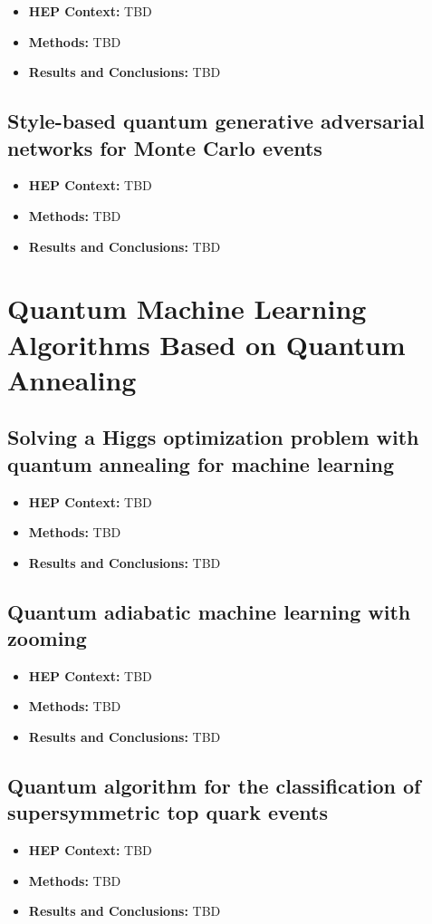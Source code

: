 \begin{itemize}
	\item \textbf{HEP Context: }TBD
	\item \textbf{Methods: }TBD
	\item \textbf{Results and Conclusions: }TBD
\end{itemize}\subsection{Style-based quantum generative adversarial networks for Monte Carlo events~\cite{Bravo-Prieto:2021ehz}}
\begin{itemize}
	\item \textbf{HEP Context: }TBD
	\item \textbf{Methods: }TBD
	\item \textbf{Results and Conclusions: }TBD
\end{itemize}

\section{Quantum Machine Learning Algorithms Based on Quantum Annealing}

\subsection{Solving a Higgs optimization problem with quantum annealing for machine learning~\cite{Mott:2017xdb}}
\begin{itemize}
	\item \textbf{HEP Context: }TBD
	\item \textbf{Methods: }TBD
	\item \textbf{Results and Conclusions: }TBD
\end{itemize}\subsection{Quantum adiabatic machine learning with zooming~\cite{Zlokapa:2019lvv}}
\begin{itemize}
	\item \textbf{HEP Context: }TBD
	\item \textbf{Methods: }TBD
	\item \textbf{Results and Conclusions: }TBD
\end{itemize}\subsection{Quantum algorithm for the classification of supersymmetric top quark events~\cite{Bargassa:2021jmk}}
\begin{itemize}
	\item \textbf{HEP Context: }TBD
	\item \textbf{Methods: }TBD
	\item \textbf{Results and Conclusions: }TBD
\end{itemize}


